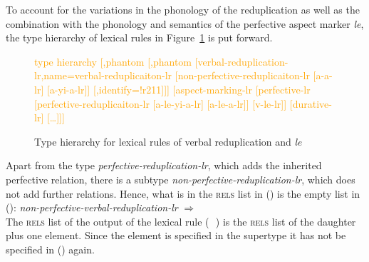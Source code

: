 \documentclass[11pt,a4paper,fleqn,draft]{article}
\newlength{\MyetagLength}
\newcommand{\iboxt}[1]{{%
  \setlength{\fboxsep}{1.25pt}%
  \fbox{$\scriptstyle #1$}%
}}
\newcommand{\ibox}[1]{%
\iboxt{#1}%
}
\newcommand{\iboxb}[1]{(\,\iboxt{#1}\,)}
\newcommand{\etag}{\ibox{\rule{0ex}{1.1ex}\hspace{\MyetagLength}}\xspace}
\newcommand{\type}[1]{{\normalfont\itshape #1\/}}
\newcommand{\impl}{$\Rightarrow$\xspace}
\newcommand{\changed}[1]{\textcolor{orange}{#1}}
\begin{document}
To account for the variations in the phonology of the reduplication as well as the combination with the phonology and semantics of the perfective aspect marker \emph{le}, 
the type hierarchy of lexical rules in Figure~\ref{fig:typehi} is put forward. 
\begin{figure}
\centering


\changed{\begin{forest}
type hierarchy
[,phantom
  [,phantom
    [verbal-reduplication-lr,name=verbal-reduplicaiton-lr
      [non-perfective-reduplicaiton-lr
        [a-a-lr]
        [a-yi-a-lr]]
      [,identify=!r211]]]
  [aspect-marking-lr
    [perfective-lr
      [perfective-reduplicaiton-lr%
        [a-le-yi-a-lr]
        [a-le-a-lr]]
      [v-le-lr]]
    [durative-lr]
    [\ldots]]]
\end{forest}}
\caption{Type hierarchy for lexical rules of verbal reduplication and \emph{le}}
\label{fig:typehi}
\end{figure}
Apart from the type \type{perfective-reduplication-lr}, which adds the inherited perfective
relation, there is a subtype \type{non-perfective-reduplication-lr}, which does not add further
relations. Hence, what is \etag in the \textsc{rels} list in () is the empty list in ():
\ea
\type{non-perfective-verbal-reduplication-lr} \impl\\
\z
The \textsc{rels} list of the output of the lexical rule \iboxb{1} is the \textsc{rels} list of
the daughter plus one element. Since the element is specified in the supertype it has not be
specified in () again. 
\end{document}
